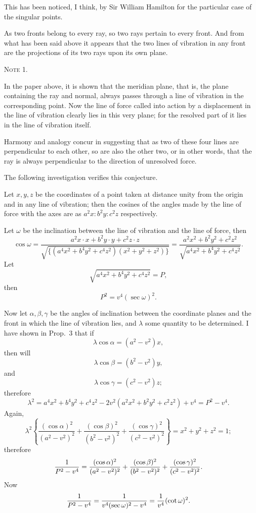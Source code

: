 \documentclass[11pt]{article}
\newcommand{\sourcepage}[1]{\marginpar{\scriptsize p.~#1}}
\begin{document}
This has been noticed, I think, by Sir William Hamilton for the particular case of the singular points.

As two fronts belong to every ray, so two rays pertain to every front. And from what has been said above it appears that the two lines of vibration in any front are the projections of its two rays upon its own plane.

\sourcepage{24}
\begin{center}{\scshape Note 1.}\end{center}

In the paper above, it is shown that the meridian plane, that is, the plane containing the ray and normal, always passes through a line of vibration in the corresponding point. Now the line of force called into action by a displacement in the line of vibration clearly lies in this very plane; for the resolved part of it lies in the line of vibration itself.

Harmony and analogy concur in suggesting that as two of these four lines are perpendicular to each other, so are also the other two, or in other words, that the ray is always perpendicular to the direction of unresolved force.

The following investigation verifies this conjecture.

Let $x,y,z$ be the coordinates of a point taken at distance unity from the origin and in any line of vibration; then the cosines of the angles made by the line of force with the axes are as $a^2x:b^2y:c^2z$ respectively.

Let $\omega$ be the inclination between the line of vibration and the line of force, then
\[
 \cos\omega=\frac{a^2x\cdot x+b^2y\cdot y+c^2z\cdot z}
 {\sqrt{\{(a^4x^2+b^4y^2+c^4z^2)(x^2+y^2+z^2)\}}}
 =\frac{a^2x^2+b^2y^2+c^2z^2}{\sqrt{a^4x^2+b^4y^2+c^4z^2}}.
\]
Let
\[
 \sqrt{a^4x^2+b^4y^2+c^4z^2}=P,
\]
then
\[
 P^2=v^4(\sec\omega)^2.
\]

Now let $\alpha,\beta,\gamma$ be the angles of inclination between the coordinate planes and the front in which the line of vibration lies, and $\lambda$ some quantity to be determined. I have shown in Prop.~3 that if
\[
 \lambda\cos\alpha=(a^2-v^2)x,
\]
then will
\[
 \lambda\cos\beta=(b^2-v^2)y,
\]
and
\[
 \lambda\cos\gamma=(c^2-v^2)z;
\]
therefore
\[
 \lambda^2=a^4x^2+b^4y^2+c^4z^2-2v^2(a^2x^2+b^2y^2+c^2z^2)+v^4=P^2-v^4.
\]
Again,
\[
 \lambda^2\left\{\frac{(\cos\alpha)^2}{(a^2-v^2)^2}
 +\frac{(\cos\beta)^2}{(b^2-v^2)^2}
 +\frac{(\cos\gamma)^2}{(c^2-v^2)^2}\right\}=x^2+y^2+z^2=1;
\]
therefore
\[
 {1\over P^2-v^4}=\frac{(\cos\alpha)^2}{(a^2-v^2)^2}
 +\frac{(\cos\beta)^2}{(b^2-v^2)^2}
 +\frac{(\cos\gamma)^2}{(c^2-v^2)^2}.
\]
Now
\[
 {1\over P^2-v^4}={1\over v^4(\sec\omega)^2-v^4}={1\over v^4}(\cot\omega)^2.
\]
\end{document}
